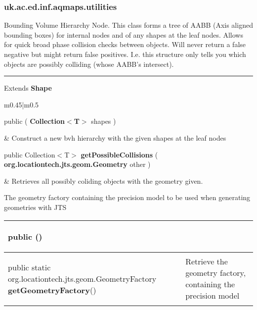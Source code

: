 \subsubsection*{ uk.ac.ed.inf.aqmaps.utilities }
 {\scriptsize Bounding Volume Hierarchy Node. This class forms a tree of AABB (Axis aligned bounding boxes) for internal nodes\newline%
 and of any shapes at the leaf nodes. Allows for quick broad phase collision checks between objects. Will never return a false negative but might return\newline%
 false positives. I.e. this structure only tells you which objects are possibly colliding (whose AABB's intersect).
 
\vspace*{4pt} \hrule \vspace*{3pt}
Extends \textbf{ Shape }
\vspace*{-5pt} 
\begin{tabularx}{\linewidth}{m{0.45\textwidth}|m{0.5\textwidth}}
\label{tab:BVHNode}
\begin{raggedleft}public  \textbf{\hyperref[tab:BVHNode]{\color{blue}{BVHNode}} }(\hspace*{ 5pt} \textbf{Collection$<$T$>$} shapes  )
\end{raggedleft} &
 Construct a new bvh hierarchy with the given shapes at the leaf nodes\\ \hline 
\begin{raggedleft}public Collection$<$T$>$ \textbf{getPossibleCollisions }(\hspace*{ 5pt} \textbf{org.locationtech.jts.geom.Geometry} other  )
\end{raggedleft} &
 Retrieves all possibly coliding objects with the geometry given.\\\end{tabularx}
}
 {\scriptsize The geometry factory containing the precision model to be used when generating geometries with JTS
 
\vspace*{-5pt} 
\begin{tabularx}{\linewidth}{m{}|m{}}
\label{tab:GeometryFactorySingleton}
\begin{raggedleft}public  \textbf{\hyperref[tab:GeometryFactorySingleton]{\color{blue}{GeometryFactorySingleton}}}()
\end{raggedleft} &
 \\ \hline 
\begin{raggedleft}public static org.locationtech.jts.geom.GeometryFactory \textbf{getGeometryFactory}()
\end{raggedleft} &
 Retrieve the geometry factory, containing the precision model\\\end{tabularx}
}
